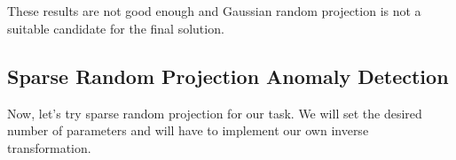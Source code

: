 \documentclass[11pt]{article}
\begin{document}
    \begin{center}
    \end{center}
    { \hspace*{\fill} \\}
    
    \begin{center}
    \end{center}
    { \hspace*{\fill} \\}
    
    These results are not good enough and Gaussian random projection is not
a suitable candidate for the final solution.

    \subsection{Sparse Random Projection Anomaly
Detection}\label{sparse-random-projection-anomaly-detection}

Now, let's try sparse random projection for our task. We will set the
desired number of parameters and will have to implement our own inverse
transformation.
\end{document}
